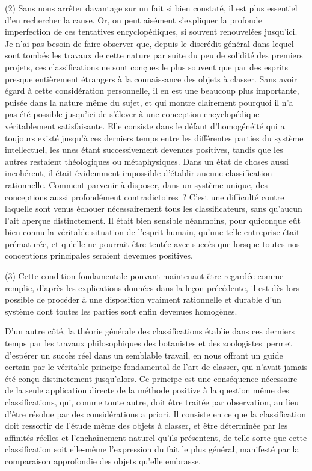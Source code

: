 \documentclass[french,twoside]{book} %
\begin{document}
(2) Sans nous arrêter davantage sur un fait si bien constaté, il est plus essentiel d’en rechercher la cause. Or, on peut aisément s’expliquer la profonde imperfection de ces tentatives encyclopédiques, si souvent renouvelées jusqu’ici. Je n’ai pas besoin de faire observer que, depuis le discrédit général dans lequel sont tombés les travaux de cette nature par suite du peu de solidité des premiers projets, ces classifications ne sont conçues le plus souvent que par des esprits presque entièrement étrangers à la connaissance des objets à classer. Sans avoir égard à cette considération personnelle, il en est une beaucoup plus importante, puisée dans la nature même du sujet, et qui montre clairement pourquoi il n’a pas été possible jusqu’ici de s’élever à une conception encyclopédique véritablement satisfaisante. Elle consiste dans le défaut d’homogénéité qui a toujours existé jusqu’à ces derniers temps entre les différentes parties du système intellectuel, les unes étant successivement devenues positives, tandis que les autres restaient théologiques ou métaphysiques. Dans un état de choses aussi incohérent, il était évidemment impossible d’établir aucune classification rationnelle. Comment parvenir à disposer, dans un système unique, des conceptions aussi profondément contradictoires ? C’est une difficulté contre laquelle sont venus échouer nécessairement tous les classificateurs, sans qu’aucun l’ait aperçue distinctement. Il était bien sensible néanmoins, pour quiconque eût bien connu la véritable situation de l’esprit humain, qu’une telle entreprise était prématurée, et qu’elle ne pourrait être tentée avec succès que lorsque toutes nos conceptions principales seraient devenues positives.\par
(3) Cette condition fondamentale pouvant maintenant être regardée comme remplie, d’après les explications données dans la leçon précédente, il est dès lors possible de procéder à une disposition vraiment rationnelle et durable d’un système dont toutes les parties sont enfin devenues homogènes.\par
D’un autre côté, la théorie générale des classifications établie dans ces derniers temps par les travaux philosophiques des botanistes et des zoologistes permet d’espérer un succès réel dans un semblable travail, en nous offrant un guide certain par le véritable principe fondamental de l’art de classer, qui n’avait jamais été conçu distinctement jusqu’alors. Ce principe est une conséquence nécessaire de la seule application directe de la méthode positive à la question même des classifications, qui, comme toute autre, doit être traitée par observation, au lieu d’être résolue par des considérations a priori. Il consiste en ce que la classification doit ressortir de l’étude même des objets à classer, et être déterminée par les affinités réelles et l’enchaînement naturel qu’ils présentent, de telle sorte que cette classification soit elle-même l’expression du fait le plus général, manifesté par la comparaison approfondie des objets qu’elle embrasse.\par
\end{document}
